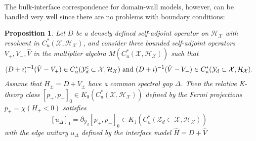 \documentclass[12pt]{amsart}
\newtheorem{proposition}[theorem]{Proposition}
\newcommand{\Hh}{{\mathcal H}}
\newcommand{\Xx}{{\mathcal X}}
\newcommand{\Yy}{{\mathcal Y}}
\newcommand{\Zz}{{\mathcal Z}}
\newcommand{\pdv}{\partial}
\begin{document}
The bulk-interface correspondence for domain-wall models, however, can be handled very well since there are no problems with boundary conditions:
\begin{proposition}\label{prop:dense_resolvent_example}
Let $D$ be a densely defined self-adjoint operator on $\Hh_\Xx$ with resolvent in $C^*_u(\Xx,\Hh_\Xx)$, and consider three bounded self-adjoint operators $V_+,V_-, \hat{V}$ in the multiplier algebra $M(C^*_u(\Xx,\Hh_\Xx))$ such that
\begin{equation}
\label{eq:relatively_compact_interface}
\begin{aligned}
(D+\imath)^{-1}(\hat{V}- V_+)\in C^*_u(\Yy_d^c\subset \Xx, \Hh_\Xx) \hbox{ and }
(D+\imath)^{-1}(\hat{V}- V_-)\in C^*_u(\Yy_d\subset \Xx, \Hh_\Xx).
\end{aligned}
\end{equation}
Assume that $H_\pm=D+ V_\pm$ have a common spectral gap $\Delta$. 
Then the relative K-theory class $[p_+,p_-]_0 \in K_0(C^*_u(\Xx,\Hh_\Xx))$ defined by the Fermi projections $p_\pm=\chi(H_\pm<0)$ satisfies
$$[u_\Delta]_1 = \pdv_{\Yy_d}[p_+,p_-]_0 \in K_1(C^*_u(\Zz_d\subset \Xx,\Hh_\Xx))$$
with the edge unitary $u_\Delta$ defined by the interface model $\hat{H}=D+ \hat{V}$
\end{proposition}
\end{document}
